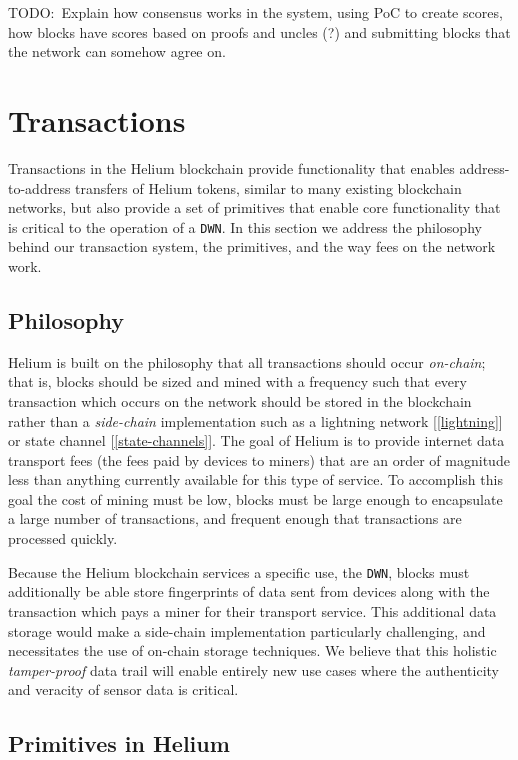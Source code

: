 \documentclass[letterpaper,11pt]{article}
\newcommand{\todo}[1]{}
\renewcommand{\todo}[1]{{\color{red} TODO:\ {#1}}}
\begin{document}
\todo{Explain how consensus works in the system, using PoC to create scores, how blocks have scores based on proofs and uncles (?) and submitting blocks that the network can somehow agree on.}

\newpage

\section{Transactions}\label{transactions}

Transactions in the Helium blockchain provide functionality that enables address-to-address transfers of Helium tokens, similar to many existing blockchain networks, but also provide a set of primitives that enable core functionality that is critical to the operation of a \verb|DWN|. In this section we address the philosophy behind our transaction system, the primitives, and the way fees on the network work.

\subsection{Philosophy}

Helium is built on the philosophy that all transactions should occur \emph{on-chain}; that is, blocks should be sized and mined with a frequency such that every transaction which occurs on the network should be stored in the blockchain rather than a \emph{side-chain} implementation such as a lightning network [\ref{lightning}] or state channel [\ref{state-channels}]. The goal of Helium is to provide internet data transport fees (the fees paid by devices to miners) that are an order of magnitude less than anything currently available for this type of service. To accomplish this goal the cost of mining must be low, blocks must be large enough to encapsulate a large number of transactions, and frequent enough that transactions are processed quickly.

Because the Helium blockchain services a specific use, the \verb|DWN|, blocks must additionally be able store fingerprints of data sent from devices along with the transaction which pays a miner for their transport service. This additional data storage would make a side-chain implementation particularly challenging, and necessitates the use of on-chain storage techniques. We believe that this holistic \emph{tamper-proof} data trail will enable entirely new use cases where the authenticity and veracity of sensor data is critical.

\subsection{Primitives in Helium}
\end{document}
